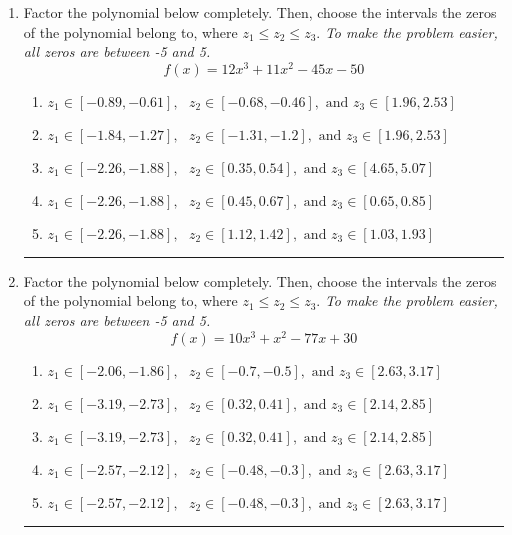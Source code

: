 \documentclass[14pt]{extbook}
\newcommand{\litem}[1]{\item#1\hspace*{-1cm}\rule{\textwidth}{0.4pt}}
\begin{document}
\begin{enumerate}
{\begin{enumerate}[label=\Alph*.]
\end{enumerate} }
\litem{
Factor the polynomial below completely. Then, choose the intervals the zeros of the polynomial belong to, where $z_1 \leq z_2 \leq z_3$. \textit{To make the problem easier, all zeros are between -5 and 5.}\[ f(x) = 12x^{3} +11 x^{2} -45 x -50 \]\begin{enumerate}[label=\Alph*.]
\item \( z_1 \in [-0.89, -0.61], \text{   }  z_2 \in [-0.68, -0.46], \text{   and   } z_3 \in [1.96, 2.53] \)
\item \( z_1 \in [-1.84, -1.27], \text{   }  z_2 \in [-1.31, -1.2], \text{   and   } z_3 \in [1.96, 2.53] \)
\item \( z_1 \in [-2.26, -1.88], \text{   }  z_2 \in [0.35, 0.54], \text{   and   } z_3 \in [4.65, 5.07] \)
\item \( z_1 \in [-2.26, -1.88], \text{   }  z_2 \in [0.45, 0.67], \text{   and   } z_3 \in [0.65, 0.85] \)
\item \( z_1 \in [-2.26, -1.88], \text{   }  z_2 \in [1.12, 1.42], \text{   and   } z_3 \in [1.03, 1.93] \)

\end{enumerate} }
\litem{
Factor the polynomial below completely. Then, choose the intervals the zeros of the polynomial belong to, where $z_1 \leq z_2 \leq z_3$. \textit{To make the problem easier, all zeros are between -5 and 5.}\[ f(x) = 10x^{3} + x^{2} -77 x + 30 \]\begin{enumerate}[label=\Alph*.]
\item \( z_1 \in [-2.06, -1.86], \text{   }  z_2 \in [-0.7, -0.5], \text{   and   } z_3 \in [2.63, 3.17] \)
\item \( z_1 \in [-3.19, -2.73], \text{   }  z_2 \in [0.32, 0.41], \text{   and   } z_3 \in [2.14, 2.85] \)
\item \( z_1 \in [-3.19, -2.73], \text{   }  z_2 \in [0.32, 0.41], \text{   and   } z_3 \in [2.14, 2.85] \)
\item \( z_1 \in [-2.57, -2.12], \text{   }  z_2 \in [-0.48, -0.3], \text{   and   } z_3 \in [2.63, 3.17] \)
\item \( z_1 \in [-2.57, -2.12], \text{   }  z_2 \in [-0.48, -0.3], \text{   and   } z_3 \in [2.63, 3.17] \)


\end{enumerate}}
\end{enumerate}
\end{document}
